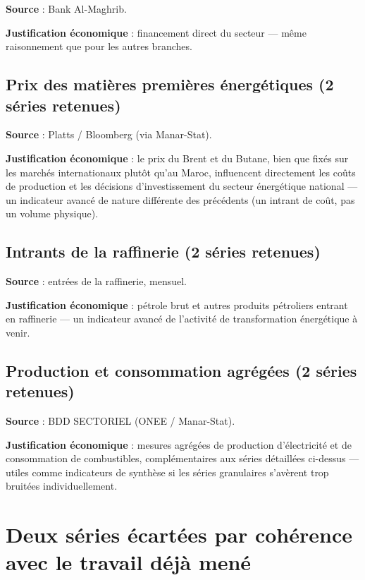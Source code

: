 \documentclass[11pt,a4paper]{article}
\begin{document}
\textbf{Source} : Bank Al-Maghrib.

\textbf{Justification économique} : financement direct du secteur --- même raisonnement que pour les autres branches.

\subsection{Prix des matières premières énergétiques (2 séries retenues)}

\textbf{Source} : Platts / Bloomberg (via Manar-Stat).

\textbf{Justification économique} : le prix du Brent et du Butane, bien que fixés sur les marchés internationaux plutôt qu'au Maroc, influencent directement les coûts de production et les décisions d'investissement du secteur énergétique national --- un indicateur avancé de nature différente des précédents (un intrant de coût, pas un volume physique).

\subsection{Intrants de la raffinerie (2 séries retenues)}

\textbf{Source} : entrées de la raffinerie, mensuel.

\textbf{Justification économique} : pétrole brut et autres produits pétroliers entrant en raffinerie --- un indicateur avancé de l'activité de transformation énergétique à venir.

\subsection{Production et consommation agrégées (2 séries retenues)}

\textbf{Source} : BDD SECTORIEL (ONEE / Manar-Stat).

\textbf{Justification économique} : mesures agrégées de production d'électricité et de consommation de combustibles, complémentaires aux séries détaillées ci-dessus --- utiles comme indicateurs de synthèse si les séries granulaires s'avèrent trop bruitées individuellement.

\section{Deux séries écartées par cohérence avec le travail déjà mené}
\end{document}
